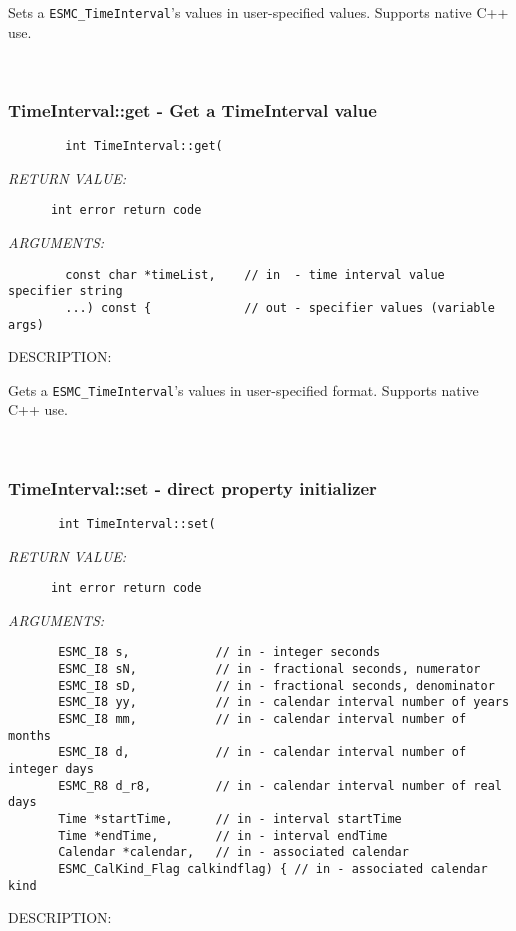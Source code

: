         Sets a {\tt ESMC\_TimeInterval}'s values in user-specified values.
        Supports native C++ use.
   
 
\mbox{}\hrulefill\ 
 
\subsubsection [TimeInterval::get] {TimeInterval::get - Get a TimeInterval value}


  
\begin{verbatim}        int TimeInterval::get(\end{verbatim}{\em RETURN VALUE:}
\begin{verbatim}      int error return code\end{verbatim}{\em ARGUMENTS:}
\begin{verbatim}        const char *timeList,    // in  - time interval value specifier string
        ...) const {             // out - specifier values (variable args)\end{verbatim}
{\sf DESCRIPTION:\\ }


        Gets a {\tt ESMC\_TimeInterval}'s values in user-specified format.
        Supports native C++ use.
   
 
\mbox{}\hrulefill\ 
 
\subsubsection [TimeInterval::set] {TimeInterval::set - direct property initializer}


  
\begin{verbatim}       int TimeInterval::set(\end{verbatim}{\em RETURN VALUE:}
\begin{verbatim}      int error return code\end{verbatim}{\em ARGUMENTS:}
\begin{verbatim}       ESMC_I8 s,            // in - integer seconds
       ESMC_I8 sN,           // in - fractional seconds, numerator
       ESMC_I8 sD,           // in - fractional seconds, denominator
       ESMC_I8 yy,           // in - calendar interval number of years
       ESMC_I8 mm,           // in - calendar interval number of months
       ESMC_I8 d,            // in - calendar interval number of integer days
       ESMC_R8 d_r8,         // in - calendar interval number of real days
       Time *startTime,      // in - interval startTime
       Time *endTime,        // in - interval endTime
       Calendar *calendar,   // in - associated calendar
       ESMC_CalKind_Flag calkindflag) { // in - associated calendar kind\end{verbatim}
{\sf DESCRIPTION:\\ }


